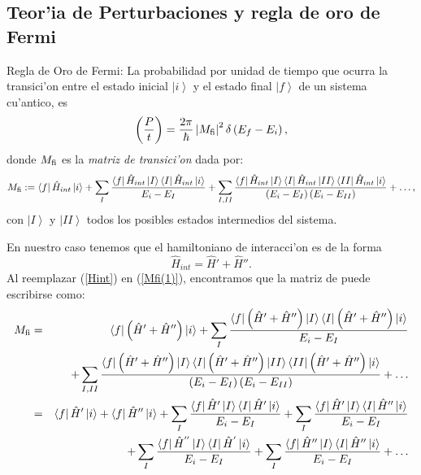 \subsection{Teor'ia de Perturbaciones y regla de oro de Fermi}

Regla de Oro de Fermi: La probabilidad por unidad de tiempo que ocurra la
transici'on entre el estado inicial $\left| i\right\rangle $ y el estado final
$\left|
f\right\rangle $ de un sistema cu'antico, es
\begin{equation}
\left( \frac{P}{t}\right)=\frac{2\pi}{\hbar}\left|
M_{\rm fi}\right|^2\delta\left( E_f%
-E_i\right) ,\label{Fermi Rule}%
\end{equation}
donde $M_{\rm fi}$ es la \textit{matriz de transici'on} dada por:%
\begin{equation}
M_{\rm fi}:=\left\langle f\right| \hat{H}_{int}\left| i\right\rangle 
+\sum_{I}\frac{\left\langle f\right| \hat{H}_{int}\left|
I\right\rangle  \left\langle I\right| \hat{H}_{int}\left|
i\right\rangle  }{E_i-E_{I}}+\sum_{I,II}\frac{\left\langle f\right|
\hat{H}_{int}\left| I\right\rangle  \left\langle I\right| \hat{H}%
_{int}\left| II\right\rangle  \left\langle II\right| \hat{H}%
_{int}\left| i\right\rangle  }{\left( E_i-E_{I}\right) \left(
E_i-E_{II}\right) }+\dots,\label{Mfi(1)}%
\end{equation}
con $\left| I\right\rangle  $ y $\left| II\right\rangle  $ todos los
posibles estados intermedios del sistema. 

En nuestro caso tenemos que el hamiltoniano de interacci'on es de la forma
\begin{equation}
\hat{H}_{int}=\hat{H}'+\hat{H}'' .\label{Hint}%
\end{equation}
Al reemplazar (\ref{Hint}) en (\ref{Mfi(1)}), encontramos que la matriz de
puede escribirse como:%
\begin{eqnarray}
M_{\rm fi} & = &\left\langle f\right| \left( \hat{H}'+\hat{H}''\right)
\left| i\right\rangle  +\sum_{I}\frac{\left\langle f\right| \left(
\hat{H}'+\hat{H}''\right) \left| I\right\rangle  \left\langle
I\right| \left( \hat{H}'+\hat{H}''\right) \left|i\right\rangle  }{E_i-E_{I}}\\
&& +\sum_{I,II}\frac{\left\langle f\right| \left( \hat
{H}'+\hat{H}''\right) \left| I\right\rangle  \left\langle
I\right| \left( \hat{H}'+\hat{H}''\right) \left|
II\right\rangle  \left\langle II\right| \left( \hat{H}'+\hat
{H}''\right) \left| i\right\rangle  }{\left( E_i-E_{I}\right) \left(
E_i-E_{II}\right) }+\dots\\
& = &\left\langle f\right| \hat{H}'\left| i\right\rangle 
+\left\langle f\right| \hat{H}''\left| i\right\rangle 
+\sum_{I}\frac{\left\langle f\right| \hat{H}'\left|
I\right\rangle  \left\langle I\right| \hat{H}'\left|
i\right\rangle  }{E_i-E_{I}}+\sum_{I}\frac{\left\langle f\right| \hat
{H}'\left| I\right\rangle  \left\langle I\right| \hat
{H}''\left| i\right\rangle  }{E_i-E_{I}}\\
&&+\sum_{I}\frac{\left\langle f\right| \hat{H}^{''
}\left| I\right\rangle  \left\langle I\right| \hat{H}^{'
}\left| i\right\rangle  }{E_i-E_{I}}+\sum_{I}\frac{\left\langle
f\right| \hat{H}''\left| I\right\rangle  \left\langle
I\right| \hat{H}''\left| i\right\rangle  }{E_i-E_{I}%
}+\dots
\end{eqnarray}


